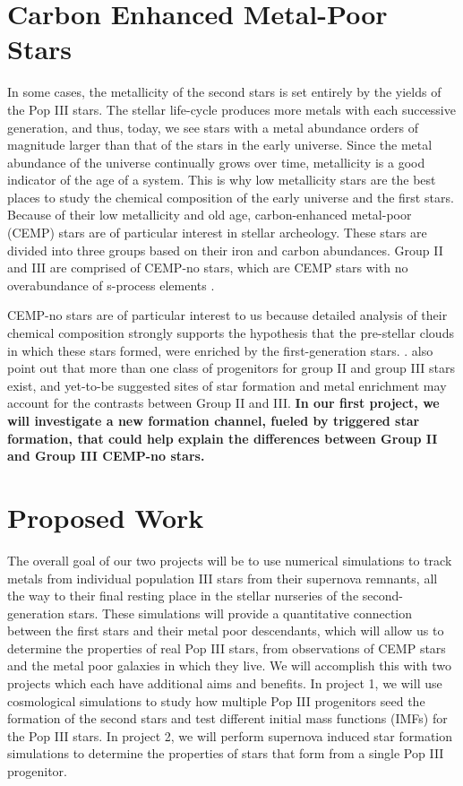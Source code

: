 \documentclass[a4paper, 12pt]{article}
\begin{document}
\section{Carbon Enhanced Metal-Poor Stars}

In some cases, the metallicity of the second stars is set entirely by the yields of the Pop III stars. The stellar life-cycle produces more metals with each successive generation, and thus, today, we see stars with a metal abundance orders of magnitude larger than that of the stars in the early universe. Since the metal abundance of the universe continually grows over time, metallicity is a good indicator of the age of a system. This is why low metallicity stars are the best places to study the chemical composition of the early universe and the first stars. Because of their low metallicity and old age, carbon-enhanced metal-poor (CEMP) stars are of particular interest in stellar archeology. These stars are divided into three groups based on their iron and carbon abundances. Group II and III are comprised of CEMP-no stars, which are CEMP stars with no overabundance of s-process elements \citep{Maeder2015}. 

CEMP-no stars are of particular interest to us because detailed analysis of their chemical composition strongly supports the hypothesis that the pre-stellar clouds in which these stars formed, were enriched by the first-generation stars. \citep{Yoon2016}. \cite{Yoon2016} also point out that more than one class of progenitors for group II and group III stars exist, and yet-to-be suggested sites of star formation and metal enrichment may account for the contrasts between Group II and III. \textbf{In our first project, we will investigate a new formation channel, fueled by triggered star formation, that could help explain the differences between Group II and Group III CEMP-no stars.}


\section{Proposed Work}
The overall goal of our two projects will be to use numerical simulations to track metals from individual population III stars from their supernova remnants, all the way to their final resting place in the stellar nurseries of the second-generation stars. These simulations will provide a quantitative connection between the first stars and their metal poor descendants, which will allow us to determine the properties of real Pop III stars, from observations of CEMP stars and the metal poor galaxies in which they live. We will accomplish this with two projects which each have additional aims and benefits. In project 1, we will use cosmological simulations to study how multiple Pop III progenitors seed the formation of the second stars and test different initial mass functions (IMFs) for the Pop III stars. In project 2, we will perform supernova induced star formation simulations to determine the properties of stars that form from a single Pop III progenitor.
\end{document}
